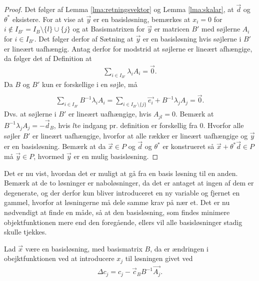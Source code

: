 \begin{proof}
Det følger af Lemma \ref{lma:retningsvektor} og Lemma \ref{lma:skalar}, at $\vec{d}$ og $\theta^*$ eksistere. 
For at vise at $\vec{y}$ er en basisløsning, bemærkes at $x_i = 0$ for $i \notin I_{B'} = I_B\setminus\{l\}\cup\{j\}$ og at Basismatrixen for $\vec{y}$ er matricen $B'$ med søjlerne $A_i$ for $i \in I_{B'}$. 
Det følger derfor af Sætning
at $\vec{y}$ er en basisløsning hvis søjlerne i $B'$ er lineært uafhængig.
Antag derfor for modstrid at søjlerne er lineært afhængige, da følger det af Definition
at
\begin{align*}
 \sum_{i \in I_{B'}} \lambda_i A_i = \vec{0}.
\end{align*}
Da $B$ og $B'$ kun er forskellige i en søjle, må
\begin{align*}
 \\ \sum_{i \in I_{B'}}  B^{-1} \lambda_i A_i  =\sum_{i \in I_{B'}\setminus \{j\}} \vec{e_i} + B^{-1} \lambda_j A_j = \vec{0}.
\end{align*}
Dvs. at søjlerne i $B'$ er lineært uafhængige, hvis $A_{jl} = 0$.
Bemærk at $B^{-1} \lambda_j A_j = - \vec{d}_B$, hvis $l$te indgang pr. definition er forskellig fra $0$. 
Hvorfor alle søjler $B'$ er lineært uafhængige, hvorfor at alle rækker er lineært uafhængige og $\vec{y}$ er en basisløsning.
Bemærk at da $\vec{x}\in P$ og $\vec{d}$ og $\theta^*$ er konstrueret så $\vec{x}+\theta^*\vec{d} \in P$ må $\vec{y} \in P$, hvormed $\vec{y}$ er en mulig basisløsning.
\end{proof}
Det er nu vist, hvordan det er muligt at gå fra en basis løsning til en anden.
 Bemærk at de to løsninger er naboløsninger, da det er antaget at ingen af dem er degenerate, og der derfor kun bliver introduceret en ny variable og fjernet en gammel, hvorfor at løsningerne må dele samme krav på nær et. 
Det er nu nødvendigt at finde en måde, så at den basisløsning, som findes minimere objektfunktionen mere end den foregående, ellers vil alle basisløsninger stadig skulle tjekkes. 
\begin{stn}
Lad $\vec{x}$ være en basisløsning, med basismatrix $B$, da er ændringen i obejktfunktionen ved at introducere $x_j$ til løsningen givet ved
\begin{align*}
 \Delta c_j = c_j-\vec{c}_B B^{-1}\vec{A_j}.
\end{align*}
\label{stn:Deltac}
\end{stn}

